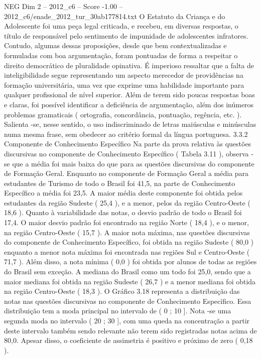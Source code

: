 \begin{textsample}{NEG Dim 2 – 2012\_c6 – Score -1.00 – 2012\_c6/enade\_2012\_tur\_30ab177814.txt}
O Estatuto da Criança e do Adolescente foi uma peça legal criticada, e recebeu, em diversas respostas, o título de responsável pelo sentimento de impunidade de adolescentes infratores.
Contudo, algumas dessas proposições, desde que bem contextualizadas e formuladas com boa argumentação, foram pontuadas de forma a respeitar o direito democrático de pluralidade opinativa.
É imperioso ressaltar que a falta de inteligibilidade segue representando um aspecto merecedor de providências na formação universitária, uma vez que exprime uma habilidade importante para qualquer profissional de nível superior.
Além de terem sido poucas respostas boas e claras, foi possível identificar a deficiência de argumentação, além dos inúmeros problemas gramaticais ( ortografia, concordância, pontuação, regência, etc. ).
Salienta -se, nesse sentido, o uso indiscriminado de letras maiúsculas e minúsculas numa mesma frase, sem obedecer ao critério formal da língua portuguesa. 3.3.2 Componente de Conhecimento Específico Na parte da prova relativa às questões discursivas no componente de Conhecimento Específico ( Tabela 3.11 ), observa -se que a média foi mais baixa do que para as questões discursivas do componente de Formação Geral.
Enquanto no componente de Formação Geral a média para estudantes de Turismo de todo o Brasil foi 41,5, na parte de Conhecimento Específico a média foi 23,5.
A maior média deste componente foi obtida pelos estudantes da região Sudeste ( 25,4 ), e a menor, pelos da região Centro-Oeste ( 18,6 ).
Quanto à variabilidade das notas, o desvio padrão de todo o Brasil foi 17,4.
O maior desvio padrão foi encontrado na região Norte ( 18,4 ), e o menor, na região Centro-Oeste ( 15,7 ).
A maior nota máxima, nas questões discursivas do componente de Conhecimento Específico, foi obtida na região Sudeste ( 80,0 ) enquanto a menor nota máxima foi encontrada nas regiões Sul e Centro-Oeste ( 71,7 ).
Além disso, a nota mínima ( 0,0 ) foi obtida por alunos de todas as regiões do Brasil sem exceção.
A mediana do Brasil como um todo foi 25,0, sendo que a maior mediana foi obtida na região Sudeste ( 26,7 ) e a menor mediana foi obtida na região Centro-Oeste ( 18,3 ).
O Gráfico 3.18 representa a distribuição das notas nas questões discursivas no componente de Conhecimento Específico.
Essa distribuição tem a moda principal no intervalo de ( 0 ; 10 ].
Nota -se uma segunda moda no intervalo ( 20 ; 30 ], com uma queda na concentração a partir deste intervalo também sendo relevante não terem sido registradas notas acima de 80,0.
Apesar disso, o coeficiente de assimetria é positivo e próximo de zero ( 0,18 ).

\end{textsample}
